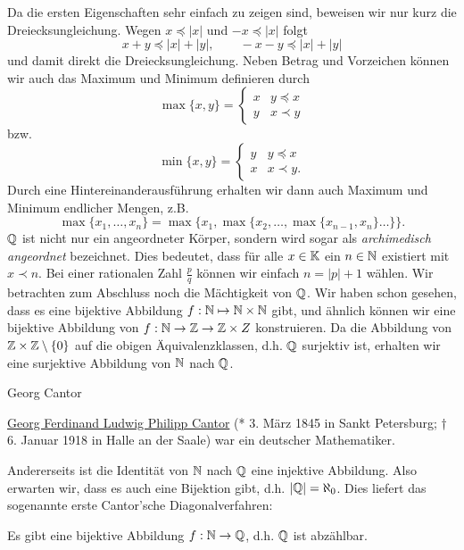 Da die ersten Eigenschaften sehr einfach zu zeigen sind, beweisen wir nur kurz die Dreiecksungleichung. Wegen \(x \preceq |x|\) und \(-x \preceq |x|\) folgt
\begin{equation*}
x+y \preceq |x|+|y|, \qquad -x-y \preceq |x|+|y|
\end{equation*}
und damit direkt die Dreiecksungleichung.
Neben Betrag und Vorzeichen können wir auch das Maximum und Minimum definieren durch
\begin{equation*}
\max\{x,y\} = \left\{ \begin{array}{rl} x & y \preceq x \\ y & x \prec y \end{array} \right.
\end{equation*}
bzw.
\begin{equation*}
\min\{x,y\} = \left\{ \begin{array}{rl} y & y \preceq x \\ x & x \prec y. \end{array} \right.
\end{equation*}
Durch eine Hintereinanderausführung erhalten wir dann auch Maximum und Minimum endlicher Mengen, z.B.
\begin{equation*}
\max\{x_1,\ldots,x_n\} = \max\{x_1,\max\{x_2, \ldots, \max\{x_{n-1},x_n\} \ldots\}\}.
\end{equation*}
\(\mathbb{Q}\) ist nicht nur ein angeordneter Körper, sondern wird sogar als \emph{archimedisch angeordnet} bezeichnet. Dies bedeutet, dass für alle \(x \in \mathbb{K}\) ein \(n \in \mathbb{N}\) existiert mit \(x \prec n\). Bei einer rationalen Zahl \(\frac{p}q\) können wir einfach \(n = |p|+1\) wählen.
Wir betrachten zum Abschluss noch die Mächtigkeit von \(\mathbb{Q}\). Wir haben schon gesehen, dass es eine bijektive Abbildung \(f: \mathbb{N} \mapsto \mathbb{N} \times \mathbb{N}\) gibt, und ähnlich können wir eine bijektive Abbildung von \(f: \mathbb{N} \rightarrow \mathbb{Z} \rightarrow \mathbb{Z} \times Z\) konstruieren. Da die Abbildung von \(\mathbb{Z} \times \mathbb{Z} \setminus \{0\}\) auf die obigen Äquivalenzklassen, d.h. \(\mathbb{Q}\) surjektiv ist, erhalten wir eine surjektive Abbildung von \(\mathbb{N}\) nach \(\mathbb{Q}\).

\begin{emphBox}{Georg Cantor}{}

\href{https://de.wikipedia.org/wiki/Georg\_Cantor}{Georg Ferdinand Ludwig Philipp Cantor} (* 3. März 1845 in Sankt Petersburg; † 6. Januar 1918 in Halle an der Saale) war ein deutscher Mathematiker.
\end{emphBox}

Andererseits ist die Identität von \(\mathbb{N}\) nach \(\mathbb{Q}\) eine injektive Abbildung. Also erwarten wir, dass es auch eine Bijektion gibt, d.h. \(|\mathbb{Q}|=\aleph_0\). Dies liefert das sogenannte erste Cantor’sche Diagonalverfahren:
\label{grundlagen/zahlensysteme:theorem-11}
\begin{theorem}{}{}



Es gibt eine bijektive Abbildung \(f: \mathbb{N} \rightarrow \mathbb{Q}\), d.h. \(\mathbb{Q}\) ist abzählbar.
\end{theorem}

